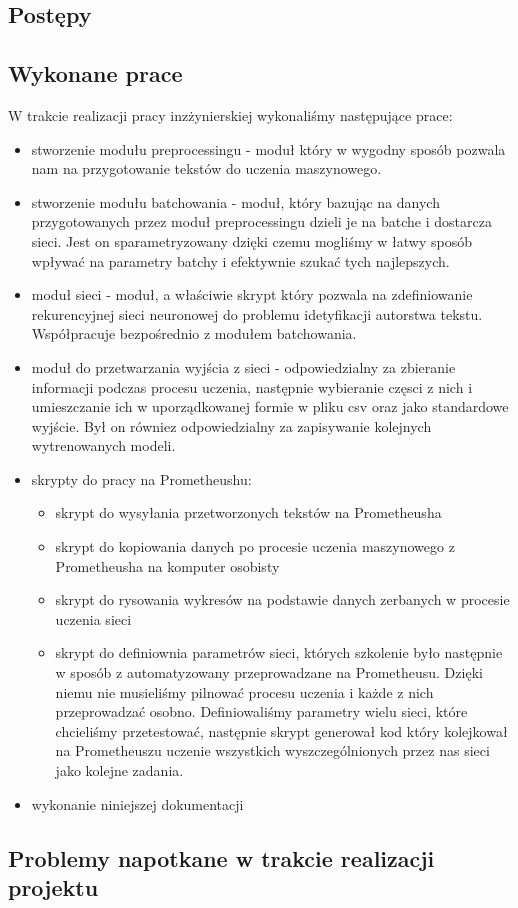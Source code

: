 \subsection{Postępy}

\subsection{Wykonane prace}
W trakcie realizacji pracy inzżynierskiej wykonaliśmy następujące prace:
\begin{itemize}
  \item stworzenie modułu preprocessingu - moduł który w wygodny sposób pozwala nam na przygotowanie tekstów 
  do uczenia maszynowego. 
  \item stworzenie modułu batchowania - moduł, który bazując na danych przygotowanych przez moduł 
  preprocessingu dzieli je na batche i dostarcza sieci. Jest on sparametryzowany dzięki czemu mogliśmy
  w łatwy sposób wpływać na parametry batchy i efektywnie szukać tych najlepszych. 
  \item moduł sieci - moduł, a właściwie skrypt który pozwala na zdefiniowanie rekurencyjnej sieci neuronowej
  do problemu idetyfikacji autorstwa tekstu. Współpracuje bezpośrednio z modułem batchowania.
  \item moduł do przetwarzania wyjścia z sieci - odpowiedzialny za zbieranie informacji podczas procesu uczenia,
  następnie wybieranie częsci z nich i umieszczanie ich w uporządkowanej formie w pliku csv oraz 
  jako standardowe wyjście. Był on równiez odpowiedzialny za zapisywanie kolejnych wytrenowanych modeli. 
  \item skrypty do pracy na Prometheushu:
  \begin{itemize}
    \item skrypt do wysyłania przetworzonych tekstów na Prometheusha 
    \item skrypt do kopiowania danych po procesie uczenia maszynowego z Prometheusha na komputer osobisty
    \item skrypt do rysowania wykresów na podstawie danych zerbanych w procesie uczenia sieci
    \item skrypt do definiownia parametrów sieci, których szkolenie było następnie w sposób z
    automatyzowany przeprowadzane na Prometheusu. Dzięki niemu nie musieliśmy pilnować procesu uczenia i 
   	każde z nich przeprowadzać osobno. Definiowaliśmy parametry wielu sieci, które chcieliśmy przetestować,
   	następnie skrypt generował kod który kolejkował na Prometheuszu uczenie wszystkich wyszczególnionych przez nas sieci 
   	jako kolejne zadania.
  \end{itemize}
  \item wykonanie niniejszej dokumentacji
\end{itemize}


\subsection{Problemy napotkane w trakcie realizacji projektu}
